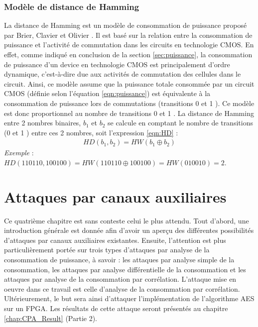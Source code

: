 \documentclass[oneside]{book}
\begin{document}
\subsection{Modèle de distance de Hamming}
\label{sec:modelHD}

La distance de Hamming est un modèle de consommation de puissance proposé par Brier, Clavier et Olivier \cite{hutchison_correlation_2004}. Il est basé sur la relation entre la consommation de puissance et l'activité de commutation dans les circuits en technologie CMOS. En effet, comme indiqué en conclusion de la section \ref{sec:puissance}, la consommation de puissance d'un device en technologie CMOS est principalement d'ordre dynamique, c'est-à-dire due aux activités de commutation des cellules dans le circuit. Ainsi, ce modèle assume que la puissance totale consommée par un circuit CMOS (définie selon l'équation \ref{eqn:puissance}) est équivalente à la consommation de puissance lors de commutations (transitions 0  et 1 ). Ce modèle est donc proportionnel au nombre de transitions 0  et 1 . La distance de Hamming entre 2 nombres binaires, $b_1$ et $b_2$ se calcule en comptant le nombre de transitions (0  et 1 ) entre ces 2 nombres, soit l'expression \ref{eqn:HD} : 
\begin{gather}
	HD(b_{1},b_{2}) = HW(b_1 \oplus b_2)\label{eqn:HD}
\end{gather}
\textit{Exemple} : $HD(110110,100100) = HW(110110 \oplus 100100) = HW(010010) = 2.$

\newpage


\chapter{Attaques par canaux auxiliaires}
\label{chap:attaques}

Ce quatrième chapitre est sans conteste celui le plus attendu. Tout d'abord, une introduction générale est donnée afin d'avoir un aperçu des différentes possibilités d'attaques par canaux auxiliaires existantes. Ensuite, l'attention est plus particulièrement portée sur trois types d'attaques par analyse de la consommation de puissance, à savoir : les attaques par analyse simple de la consommation, les attaques par analyse différentielle de la consommation et les attaques par analyse de la consommation par corrélation. L'attaque mise en oeuvre dans ce travail est celle d'analyse de la consommation par corrélation. Ultérieurement, le but sera ainsi d'attaquer l'implémentation de l'algorithme AES sur un FPGA. Les résultats de cette attaque seront présentés au chapitre \ref{chap:CPA_Result} (Partie 2). 
\end{document}
